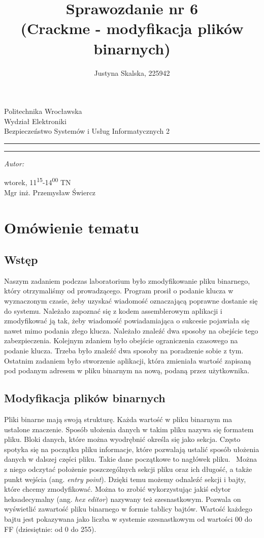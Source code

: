 \documentclass[12pt,a4paper,titlepage]{article}
\author{Justyna Skalska, 225942}
\title{Sprawozdanie nr 6\\
(Crackme - modyfikacja plików binarnych)}
\makeatletter
\newcommand{\linia}{\rule{\linewidth}{0.4mm}}
\renewcommand{\maketitle}{\begin{titlepage}
    \vspace*{1cm}
    \begin{center}\small
    Politechnika Wrocławska\\
    Wydział Elektroniki\\
    Bezpieczeństwo Systemów i Usług Informatycznych 2
    \end{center}
    \vspace{3cm}
    \noindent\linia
    \begin{center}
      \LARGE \textsc{\@title}
         \end{center}
     \linia
    \vspace{0.5cm}
    \begin{flushright}
    \begin{minipage}{7cm}
    \textit{\small Autor:}\\
    \normalsize \textsc{\@author} \par
    \end{minipage}
    \vspace{5cm}

     {\small wtorek, 11\textsuperscript{15}-14\textsuperscript{00} TN}\\
        Mgr inż. Przemysław Świercz
     \end{flushright}
    \vspace*{\stretch{6}}
    \begin{center}
    \@date
    \end{center}
  \end{titlepage}%
}
\makeatother
\begin{document}

\maketitle

\tableofcontents 
\newpage
\listoflistings
\newpage

\section{Omówienie tematu}
\subsection{Wstęp}
Naszym zadaniem podczas laboratorium było zmodyfikowanie pliku binarnego, który otrzymaliśmy od prowadzącego. Program prosił o podanie klucza w wyznaczonym czasie, żeby uzyskać wiadomość oznaczającą poprawne dostanie się do systemu. Należało zapoznać się z kodem assemblerowym aplikacji i zmodyfikować ją tak, żeby wiadomość powiadamiająca o sukcesie pojawiała się nawet mimo podania złego klucza. Należało znaleźć dwa sposoby na obejście tego zabezpieczenia. Kolejnym zdaniem było obejście ograniczenia czasowego na podanie klucza. Trzeba było znaleźć dwa sposoby na poradzenie sobie z tym. Ostatnim zadaniem było stworzenie aplikacji, która zmieniała wartość zapisaną pod podanym adresem w pliku binarnym na nową, podaną przez użytkownika.

\subsection{Modyfikacja plików binarnych}
Pliki binarne mają swoją strukturę. Każda wartość w pliku binarnym ma ustalone znaczenie. Sposób ułożenia danych w takim pliku nazywa się formatem pliku. Bloki danych, które można wyodrębnić określa się jako sekcja. Często spotyka się na początku pliku informacje, które pozwalają ustalić sposób ułożenia danych w dalszej części pliku. Takie dane początkowe to nagłówek pliku.~\cite{pliki-binarne} Można z niego odczytać położenie poszczególnych sekcji pliku oraz ich długość, a także punkt wejścia (ang. \textit{entry point}). Dzięki temu możemy odnaleźć sekcji i bajty, które chcemy zmodyfikować. Można to zrobić wykorzystując jakiś edytor heksadecymalny (ang. \textit{hex editor}) nazywany też szesnastkowym. Pozwala on wyświetlić zawartość pliku binarnego w formie tablicy bajtów. Wartość każdego bajtu jest pokazywana jako liczba w systemie szesnastkowym od wartości 00 do FF (dziesiętnie: od 0 do 255).~\cite{pliki-binarne}
\end{document}
